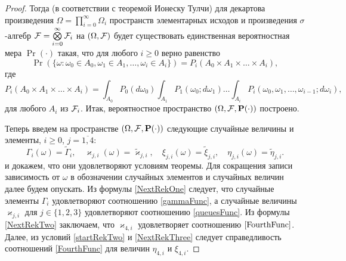 \documentclass{report}
\begin{document}
\begin{proof}
Тогда (в соответствии с теоремой Ионеску Тулчи) для декартова произведения $\Omega=\prod\limits_{i=0}^{\infty}\Omega_i$ пространств элементарных исходов и произведения $\sigma$-алгебр ${\cal F}=\bigotimes\limits_{i=0}^{\infty} {\cal F}_i$ на $(\Omega,{\cal F})$ будет существовать единственная вероятностная мера $\Pr(\cdot)$ такая, что для любого $i \geqslant 0$ верно равенство
\begin{equation}
\Pr(\{\omega \colon \omega_0 \in A_0, \omega_1 \in A_1, \ldots, \omega_i\in A_i\})= P_i(A_0 \times A_1 \times \ldots \times A_i),
\label{ProbabilitiesGeneral}
\end{equation}
где 
\begin{equation}
 P_i(A_0 \times A_1 \times \ldots \times A_i) = \int_{A_0} P_0(d \omega_0) \int_{A_1} P_1(\omega_0;d \omega_1) \ldots \int_{A_i} P_i(\omega_0, \omega_1, \ldots, \omega_{i-1}; d \omega_i),
\label{ProbabilitiesGeneralOne}
\end{equation}
для любого $A_i$ из ${\cal F}_i$. Итак, вероятностное пространство $(\Omega,{\cal F},\Pr(\cdot))$ построено. 

Теперь введем на пространстве $(\Omega,{\cal F},\Pr(\cdot))$ следующие случайные величины и элементы, $i \geqslant 0$, $j =\overline{1,4}$:
\begin{equation*}
    \Gamma_i(\omega) = \tilde{\Gamma}_i, \quad \varkappa_{j,i}(\omega) = \tilde{\varkappa}_{j,i},\quad
    \xi_{j,i}(\omega) = \tilde{\xi}_{j,i}, \quad \eta_{j,i}(\omega) = \tilde{\eta}_{j,i}.
\end{equation*}
и докажем, что они  удовлетворяют условиям теоремы. Для сокращения записи зависимость от $\omega$ в обозначении случайных элементов и случайных величин далее будем опускать. Из формулы \eqref{NextRekOne} следует, что случайные элементы $\Gamma_i$ удовлетворяют соотношению \eqref{gammaFunc}, а случайные величины $\varkappa_{j,i}$ для $j\in \{1, 2, 3\}$ удовлетворяют соотношению \eqref{queuesFunc}. Из формулы \eqref{NextRekTwo} заключаем, что $\varkappa_{4,i}$ удовлетворяет соотношению $\eqref{FourthFunc}$. Далее, из условий \eqref{startRekTwo} и \eqref{NextRekThree} следует справедливость соотношений \eqref{FourthFunc} для величин $\eta_{4,i}$ и $\xi_{4,i}$. 


\end{proof}
\end{document}

